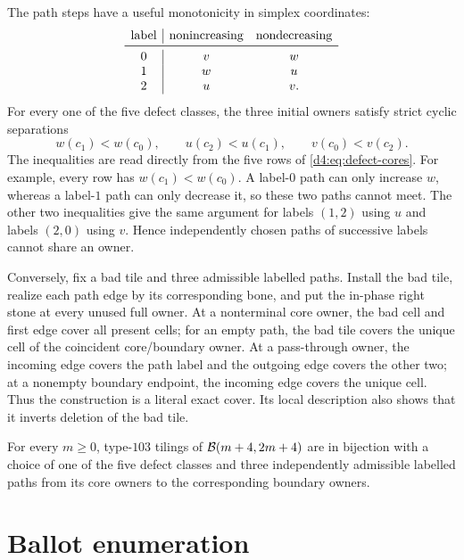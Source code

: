 The path steps have a useful monotonicity in simplex coordinates:
\begin{equation}\label{d4:eq:path-monotonicity}
\begin{array}{c|cc}
\text{label}&\text{nonincreasing}&\text{nondecreasing}\\ \midrule
0&v&w\\
1&w&u\\
2&u&v.
\end{array}
\end{equation}
For every one of the five defect classes, the three initial owners satisfy
strict cyclic separations
\begin{equation}\label{d4:eq:core-separation}
 w(c_1)<w(c_0),\qquad u(c_2)<u(c_1),\qquad v(c_0)<v(c_2).
\end{equation}
The inequalities are read directly from the five rows of
\eqref{d4:eq:defect-cores}.  For example, every row has
$w(c_1)<w(c_0)$.  A label-$0$ path can only increase $w$, whereas a label-$1$
path can only decrease it, so these two paths cannot meet.  The other two
inequalities give the same argument for labels $(1,2)$ using $u$ and labels
$(2,0)$ using $v$.  Hence independently chosen paths of successive labels
cannot share an owner.

Conversely, fix a bad tile and three admissible labelled paths.  Install the
bad tile, realize each path edge by its corresponding bone, and put the
in-phase right stone at every unused full owner.  At a nonterminal core owner,
the bad cell and first edge cover all present cells; for an empty path, the
bad tile covers the unique cell of the coincident core/boundary owner.  At a
pass-through owner, the incoming edge covers the path label and the outgoing
edge covers the other two; at a nonempty boundary endpoint, the incoming edge
covers the unique cell.  Thus the construction is a literal exact cover.  Its
local description also shows that it inverts deletion of the bad tile.

\begin{proposition}\label{d4:prop:bijection}
For every $m\ge0$, type-$103$ tilings of $\mathcal B(m+4,2m+4)$ are in bijection
with a choice of one of the five defect classes and three independently
admissible labelled paths from its core owners to the corresponding boundary
owners.
\end{proposition}

\section{Ballot enumeration}

